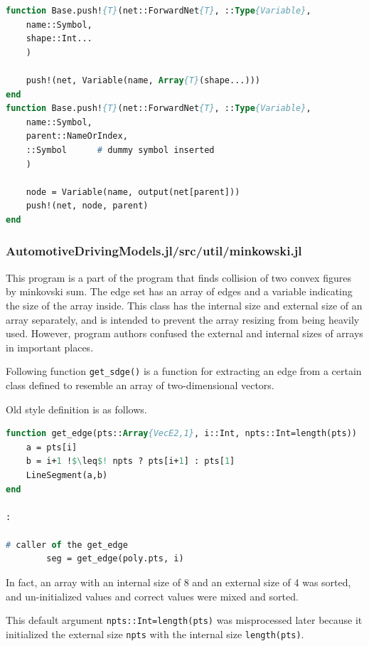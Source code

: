 \begin{lstlisting}[caption=Changed code 
,label=list:julia_06_forwardnets, language=Pascal, frame=single]
function Base.push!{T}(net::ForwardNet{T}, ::Type{Variable},
    name::Symbol,
    shape::Int...
    )

    push!(net, Variable(name, Array{T}(shape...)))
end
function Base.push!{T}(net::ForwardNet{T}, ::Type{Variable},
    name::Symbol,
    parent::NameOrIndex,
    ::Symbol      # dummy symbol inserted
    )

    node = Variable(name, output(net[parent]))
    push!(net, node, parent)
end
\end{lstlisting}

\subsubsection{AutomotiveDrivingModels.jl/src/util/minkowski.jl}

This program is a part of the program that finds collision of two convex figures by minkovski sum.
The edge set has an array of edges and a variable indicating the size of the array inside. 
This class has the internal size and external size of an array separately, and is intended to prevent the array resizing from being heavily used.
However, program authors confused the external and internal sizes of arrays in important places.

Following function {\tt get\_sdge()} is a function for extracting an edge from a certain class defined to resemble an array of two-dimensional vectors.

Old style definition is as follows.

\begin{lstlisting}[caption=Julia old style definition 
,label=list:julia_05_automotive, escapechar=!, language=Pascal, frame=single]
function get_edge(pts::Array{VecE2,1}, i::Int, npts::Int=length(pts))
    a = pts[i]
    b = i+1 !$\leq$! npts ? pts[i+1] : pts[1]
    LineSegment(a,b)
end

:

# caller of the get_edge
        seg = get_edge(poly.pts, i)

\end{lstlisting}

In fact, an array with an internal size of 8 and an external size of 4 was sorted, and un-initialized values and correct values were mixed and sorted.

This default argument {\tt npts::Int=length(pts)} was misprocessed later because it initialized the external size {\tt npts} with the internal size {\tt length(pts)}.



